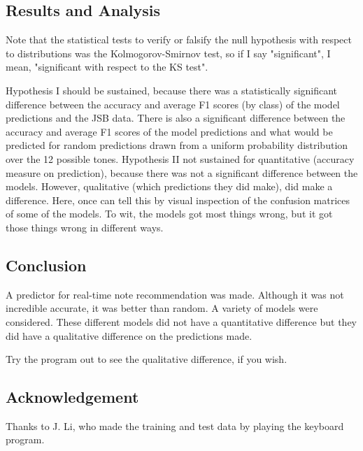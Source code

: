 \documentclass{article}
\begin{document}
\subsection*{Results and Analysis}
Note that the statistical tests to verify or falsify the null hypothesis with respect to distributions was the Kolmogorov-Smirnov test, so if I say "significant", I mean, "significant with respect to the KS test".

Hypothesis I should be sustained, because there was a statistically significant difference between the accuracy and average F1 scores (by class) of the model predictions and the JSB data. There is also a significant difference between the accuracy and average F1 scores of the model predictions and what would be predicted for random predictions drawn from a uniform probability distribution over the 12 possible tones.
Hypothesis II not sustained for quantitative (accuracy measure on prediction), because there was not a significant difference between the models.
However, qualitative (which predictions they did make), did make a difference. Here, once can tell this by visual inspection of the confusion matrices of some of the models. To wit, the models got most things wrong, but it got those things wrong in different ways.

\subsection*{Conclusion}
A predictor for real-time note recommendation was made.
Although it was not incredible accurate, it was better than random.
A variety of models were considered.
These different models did not have a quantitative difference but they did have a qualitative difference on the predictions made.

Try the program out to see the qualitative difference, if you wish.

\subsection*{Acknowledgement}
Thanks to J. Li, who made the training and test data by playing the keyboard program.
\end{document}

